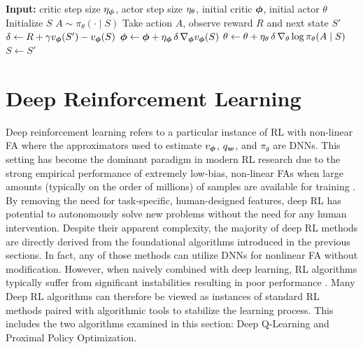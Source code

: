 \begin{algorithm}[htbp]
\caption{Actor-Critic with Advantage and TD(0) Target}
\label{alg:ac}
\begin{algorithmic}[1]
\State \textbf{Input:} critic step size $\eta_{{\bm \phi}}$, actor step size $\eta_\theta$, initial critic ${\bm \phi}$, initial actor $\theta$
    \State Initialize $S$
        \State $A \sim \pi_\theta(\cdot \mid S)$
        \State Take action $A$, observe reward $R$ and next state $S'$
        \State $\delta \gets R + \gamma v_{\bm \phi}(S') - v_{\bm \phi}(S)$ 
        \State ${\bm \phi} \gets {\bm \phi} + \eta_{{\bm \phi}}\, \delta\, \nabla_{{\bm \phi}} v_{\bm \phi}(S)$
        \State $\theta \gets \theta + \eta_\theta\, \delta\, \nabla_\theta \log \pi_\theta(A \mid S)$
        \State $S \gets S'$
    \EndWhile
\EndFor
\end{algorithmic}
\end{algorithm}

\FloatBarrier
\section{Deep Reinforcement Learning}
Deep reinforcement learning refers to a particular instance of RL with non-linear FA where the approximators used to estimate $v_{\bm \phi}$, $q_{\bm w}$, and $\pi_\theta$ are DNNs. This setting has become the dominant paradigm in modern RL research due to the strong empirical performance of extremely low-bias, non-linear FAs when large amounts (typically on the order of millions) of samples are available for training . By removing the need for task-specific, human-designed features, deep RL has potential to autonomously solve new problems without the need for any human intervention. Despite their apparent complexity, the majority of deep RL methods are directly derived from the foundational algorithms introduced in the previous sections. In fact, any of those methods can utilize DNNs for nonlinear FA without modification. However, when naively combined with deep learning, RL algorithms typically suffer from significant instabilities resulting in poor performance . Many Deep RL algorithms can therefore be viewed as instances of standard RL methods paired with algorithmic tools to stabilize the learning process. This includes the two algorithms examined in this section: Deep Q-Learning and Proximal Policy Optimization.


